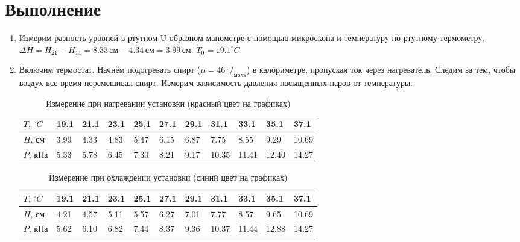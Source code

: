\documentclass[a4paper,12pt]{article}
\begin{document}
	\section{Выполнение}
	\begin{enumerate}
		\item Измерим разность уровней в ртутном U-образном манометре с помощью микроскопа и температуру по ртутному термометру. $\Delta H = H_{21} - H_{11} = 8.33\,см - 4.34\,см = 3.99\,см$. $T_0 = 19.1^\circ C$.
		
		\item Включим термостат. Начнём подогревать спирт ($\mu = 46\, ^{г}/_{моль}$) в калориметре, пропуская ток через нагреватель. Следим за тем, чтобы воздух все время перемешивал спирт. Измерим зависимость давления насыщенных паров от температуры.
		
		\begin{table}[h!] 
			\caption{Измерение при нагревании установки (красный цвет на графиках)}
			\begin{center}
				\begin{tabular}{|*{11}{l|}} \hline
					$T,\, ^\circ C$ & 19.1 & 21.1 & 23.1 & 25.1 & 27.1 & 29.1 & 31.1 & 33.1 & 35.1 & 37.1 \\ \hline
					$H,\, см$ & 3.99 & 4.33 & 4.83 & 5.47 & 6.15 & 6.87 & 7.75 & 8.55 & 9.29 & 10.69 \\ \hline
					$P,\, кПа$ & 5.33 & 5.78 & 6.45 & 7.30 & 8.21 & 9.17 & 10.35 & 11.41 & 12.40 & 14.27 \\ \hline
				\end{tabular}
			\end{center}
		\end{table}
	
		\begin{table}[h!] 
			\caption{Измерение при охлаждении установки (синий цвет на графиках)}
			\begin{center}
				\begin{tabular}{|*{11}{l|}} \hline
					$T,\, ^\circ C$ & 19.1 & 21.1 & 23.1 & 25.1 & 27.1 & 29.1 & 31.1 & 33.1 & 35.1 & 37.1 \\ \hline
					$H,\, см$ & 4.21 & 4.57 & 5.11 & 5.57 & 6.27 & 7.01 & 7.77 & 8.57 & 9.65 & 10.69 \\ \hline
					$P,\, кПа$ & 5.62 & 6.10 & 6.82 & 7.44 & 8.37 & 9.36 & 10.37 & 11.44 & 12.88 & 14.27 \\ \hline
				\end{tabular}
			\end{center}
		\end{table}
		

\end{enumerate}
\end{document}
